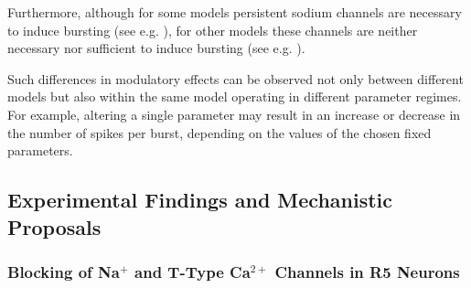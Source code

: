 \documentclass[../main.tex]{subfiles}
\begin{document}
Furthermore, although for some models persistent sodium channels are necessary to induce bursting (see e.g. \parencite{liuMultipleConductancesCooperatively2008,wangMultipleDynamicalModes1994}), for other models these channels are neither necessary nor sufficient to induce bursting (see e.g. \parencite{golombContributionPersistentNa2006}).

Such differences in modulatory effects can be observed not only between different models but also within the same model operating in different parameter regimes. For example, altering a single parameter may result in an increase or decrease in the number of spikes per burst, depending on the values of the chosen fixed parameters.










\subsection{Experimental Findings and Mechanistic Proposals} \label{subsec:experiments_and_proposals}

\subsubsection{\texorpdfstring{Blocking of Na$^+$ and T-Type Ca$^{2+}$ Channels in R5 Neurons}{Blocking of Na and T-Type Ca2+ Channels in R5 Neurons}} \label{subsubsec:experiment_ttx_t_type_block}
\end{document}
